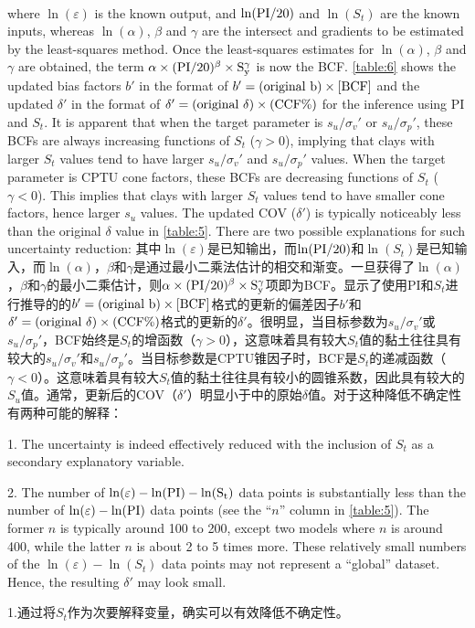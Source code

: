 \begin{Parallel}{0.60\textwidth}{}
\begin{align}
        \label{equation:9}
    \end{align}
    \ParallelLText
    {
        where $\ln(\varepsilon)$ is the known output, and $\ln(\rm{PI}/20)$ and $\ln(S_t)$ are the known inputs, whereas $\ln(\alpha)$, $\beta$ and $\gamma$ are the intersect and gradients to be estimated by the least-squares method. Once the least-squares estimates for $\ln(\alpha)$, $\beta$ and $\gamma$ are obtained, the term $\alpha\times{}(\rm{PI}/20)^\beta\times{}S_y^\gamma$ is now the BCF. \autoref{table:6} shows the updated bias factors $b'$ in the format of $b'=(\rm{original}~b)\times{}[BCF]$ and the updated $\delta'$ in the format of $\delta'=(\rm{original}~\delta)\times{}(\rm{CCF}\%)$ for the inference using PI and $S_t$. It is apparent that when the target parameter is $s_u/\sigma_v'$ or $s_u/\sigma_p'$, these BCFs are always increasing functions of $S_t$ ($\gamma>0$), implying that clays with larger $S_t$ values tend to have larger $s_u/\sigma_v'$ and $s_u/\sigma_p'$ values. When the target parameter is CPTU cone factors, these BCFs are decreasing functions of $S_t$ ($\gamma<0$). This implies that clays with larger $S_t$ values tend to have smaller cone factors, hence larger $s_u$ values. The updated COV ($\delta'$) is typically noticeably less than the original $\delta$ value in \autoref{table:5}. There are two possible explanations for such uncertainty reduction:
    }
    \ParallelRText
    {
        其中$\ln(\varepsilon)$是已知输出，而$\ln(\rm{PI}/20)$和$\ln(S_t)$是已知输入，而$\ln(\alpha)$，$\beta$和$\gamma$是通过最小二乘法估计的相交和渐变。一旦获得了$\ln(\alpha)$，$\beta$和$\gamma$的最小二乘估计，则$\alpha\times{}(\rm{PI}/20)^\beta\times{}S_y^\gamma$项即为BCF。显示了使用PI和$S_t$进行推导的的$b'=(\rm{original}~b)\times{}[BCF]$格式的更新的偏差因子$b'$和$\delta'=(\rm{original}~\delta)\times{}(\rm{CCF}\%)$格式的更新的$\delta'$。很明显，当目标参数为$s_u/\sigma_v'$或$s_u/\sigma_p'$，BCF始终是$S_t$的增函数（$\gamma>0$），这意味着具有较大$S_t$值的黏土往往具有较大的$s_u/\sigma_v'$和$s_u/\sigma_p'$。当目标参数是CPTU锥因子时，BCF是$S_t$的递减函数（$\gamma<0$）。这意味着具有较大$S_t$值的黏土往往具有较小的圆锥系数，因此具有较大的$S_u$值。通常，更新后的COV（$\delta'$）明显小于中的原始$\delta$值。对于这种降低不确定性有两种可能的解释：
    }
    \ParallelPar
    \ParallelLText
    {
        1. The uncertainty is indeed effectively reduced with the inclusion of $S_t$ as a secondary explanatory variable.

        2. The number of $\ln(\varepsilon)-\ln(\rm{PI})-\ln(S_t)$ data points is substantially less than the number of $\ln(\varepsilon)-\ln(\rm{PI})$ data points (see the “$n$” column in \autoref{table:5}). The former $n$ is typically around 100 to 200, except two models where $n$ is around 400, while the latter $n$ is about 2 to 5 times more. These relatively small numbers of the $\ln(\varepsilon)-\ln(S_t)$ data points may not represent a “global” dataset. Hence, the resulting $\delta'$ may look small.
    }
    \ParallelRText
    {
        1.通过将$S_t$作为次要解释变量，确实可以有效降低不确定性。

}
\end{Parallel}
